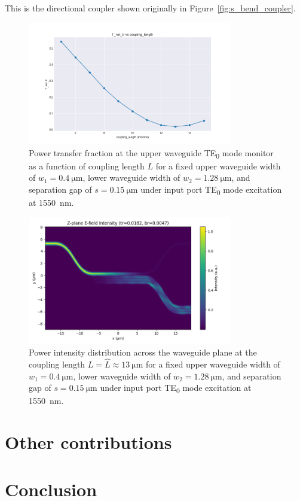 \documentclass[10pt, a4paper]{article}
\begin{document}
This is the directional coupler shown originally in Figure~\ref{fig:s_bend_coupler}.

\begin{figure}[h!]
  \centering
  \includegraphics[width=0.8\textwidth]{task3/sweep_plots/sweep_idx_8_sweep__coupling_length=5_15_11_wg1_width=0.4_wg2_width=1.28_separation=0.15_center_wavelength=1.55_T_net_tr_line.png}
  \caption{Power transfer fraction at the upper waveguide TE\textsubscript{0} mode monitor as a function of coupling length \(L\) for a fixed upper waveguide width of \(w_1=\SI{0.4}{\um}\), lower waveguide width of \(w_2=\SI{1.28}{\um}\), and separation gap of \(s=\SI{0.15}{\um}\) under input port TE\textsubscript{0} mode excitation at \SI{1550}{\nm}.}
  \label{fig:te0_te2_coupling_length}
\end{figure}
\begin{figure}[h!]
  \centering
  \includegraphics[width=0.8\textwidth]{task3/sim_1521_130625/z_plane_intensity.png}
  \caption{Power intensity distribution across the waveguide plane at the coupling length \(L=\hat{L}\approx\SI{13}{\um}\) for a fixed upper waveguide width of \(w_1=\SI{0.4}{\um}\), lower waveguide width of \(w_2=\SI{1.28}{\um}\), and separation gap of \(s=\SI{0.15}{\um}\) under input port TE\textsubscript{0} mode excitation at \SI{1550}{\nm}.}
  \label{fig:cross_mode_power_distribution}
\end{figure}



\section{Other contributions}


\section{Conclusion}


\printbibliography
\end{document}
